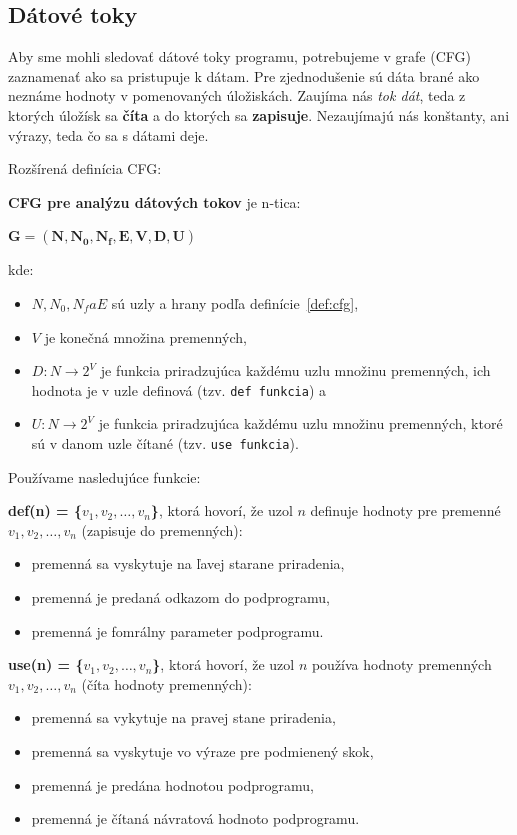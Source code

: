 \subsection{Dátové toky}
Aby sme mohli sledovať dátové toky programu, potrebujeme v grafe (CFG) zaznamenať ako sa pristupuje k dátam.
Pre zjednodušenie sú dáta brané ako neznáme hodnoty v pomenovaných úložiskách.
Zaujíma nás \textit{tok dát}, teda z ktorých úložísk sa \textbf{číta} a do ktorých sa \textbf{zapisuje}.
Nezaujímajú nás konštanty, ani výrazy, teda čo sa s dátami deje.

Rozšírená definícia CFG:
\begin{definition}
	\textbf{CFG pre analýzu dátových tokov} je n-tica: 
	\begin{center}
		$\mathbf{G = (N, N_0, N_f, E, V, D, U)}$
	\end{center}
	kde:
	\begin{itemize}
		\item $N, N_0, N_f a E$ sú uzly a hrany podľa definície~\ref{def:cfg},
		\item $V$ je konečná množina premenných,
		\item $D: N \rightarrow 2^V$ je funkcia priradzujúca každému uzlu množinu premenných, ich hodnota je v uzle definová (tzv. \texttt{def funkcia}) a
		\item $U: N \rightarrow 2^V$ je funkcia priradzujúca každému uzlu množinu premenných, ktoré sú v danom uzle čítané (tzv. \texttt{use funkcia}).
	\end{itemize}
\end{definition}

Používame nasledujúce funkcie:
\begin{description}
\item \textbf{def(n) = \{$v_1, v_2, \ldots, v_n$\}}, ktorá hovorí, že uzol $n$ definuje hodnoty pre premenné $v_1, v_2, \ldots, v_n$ (zapisuje do premenných):
	\begin{itemize}
		\item premenná sa vyskytuje na ľavej starane priradenia,
		\item premenná je predaná odkazom do podprogramu,
		\item premenná je fomrálny parameter podprogramu.
	\end{itemize}
\item \textbf{use(n) = \{$v_1, v_2, \ldots, v_n$\}}, ktorá hovorí, že uzol $n$ používa hodnoty premenných $v_1, v_2, \ldots, v_n$ (číta hodnoty premenných):
	\begin{itemize}
		\item premenná sa vykytuje na pravej stane priradenia,
		\item premenná sa vyskytuje vo výraze pre podmienený skok,
		\item premenná je predána hodnotou podprogramu,
		\item premenná je čítaná návratová hodnoto podprogramu.
	\end{itemize}
\end{description}

